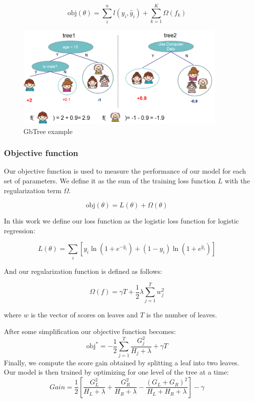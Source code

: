 \documentclass[cic,tc,english]{iiufrgs}
\begin{document}
$$\text{obj}(\theta) = \sum_i^n l(y_i, \hat{y}_i) + \sum_{k=1}^K \Omega(f_k)$$

\begin{figure}
    \caption{GbTree example}
    \begin{center}
        \includegraphics[width=28em]{twocart}
    \end{center}
    \label{fig:ex1}
\end{figure}

\subsubsection{Objective function}
Our objective function is used to measure the performance of our model for each set of parameters. We define it as the sum of the training loss function \(L\) with the regularization term $\Omega$.

$$\text{obj}(\theta) = L(\theta) + \Omega(\theta)$$

In this work we define our loss function as the logistic loss function for logistic regression:

$$L(\theta) = \sum_i[ y_i\ln (1+e^{-\hat{y}_i}) + (1-y_i)\ln (1+e^{\hat{y}_i})]$$

And our regularization function is defined as follows:

$$\Omega(f) = \gamma T + \frac{1}{2}\lambda \sum_{j=1}^T w_j^2$$

where \(w\) is the vector of scores on leaves and \(T\) is the number of leaves.

After some simplification our objective function becomes:
$$
\text{obj}^\ast = -\frac{1}{2} \sum_{j=1}^T \frac{G_j^2}{H_j+\lambda} + \gamma T
$$
Finally, we compute the score gain obtained by splitting a leaf into two leaves. Our model is then trained by optimizing for one level of the tree at a time:
$$
Gain = \frac{1}{2} \left[\frac{G_L^2}{H_L+\lambda}+\frac{G_R^2}{H_R+\lambda}-\frac{(G_L+G_R)^2}{H_L+H_R+\lambda}\right] - \gamma
$$
\end{document}
